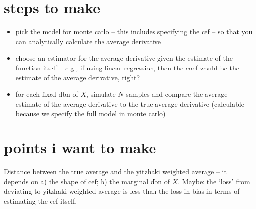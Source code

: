 \documentclass[a4paper,12pt,twoside]{article}
\begin{document}
\section*{steps to make}

\begin{itemize}
  \item pick the model for monte carlo -- this includes specifying the cef -- so that you can analytically calculate the average derivative
  \item choose an estimator for the average derivative given the estimate of the function itself -- e.g., if using linear regression, then the coef would be the estimate of the average derivative, right?
  \item for each fixed dbn of $X$, simulate $N$ samples and compare the average estimate of the average derivative to the true average derivative (calculable because we specify the full model in monte carlo)
\end{itemize}


\section*{points i want to make}

Distance between the true average and the yitzhaki weighted average -- it depends on a) the shape of cef; b) the marginal dbn of $X$. Maybe: the `loss' from deviating to yitzhaki weighted average is less than the loss in bias in terms of estimating the cef itself.
\end{document}
